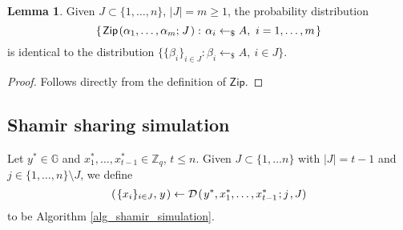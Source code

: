 \documentclass[10pt, psamsfonts, reqno]{amsart}
\theoremstyle{definition}
\newtheorem{lemma}[thm]{Lemma}
\theoremstyle{remark}
\numberwithin{equation}{section}
\begin{document}
\begin{lemma}\label{zip_lemma}
Given $J \subset \{1, \dots, n\}$, $|J| = m \ge 1$,
the probability distribution
\vspace{5pt}
\begin{equation*}
\{\hspace{1pt}
\mathsf{Zip}\hspace{1pt}(
\alpha_1, \dots, \alpha_m;\hspace{1pt} J\hspace{1pt}):
\hspace{1pt}\alpha_i \leftarrow_\$ A,
\ i = 1, \dots, m
\hspace{1pt}\}
\vspace{5pt}
\end{equation*}
is identical to the distribution
$\{\{\beta_i\}_{i \in J}: \beta_i \leftarrow_\$ A,\ i \in J\}$.
\end{lemma}

\begin{proof}
Follows directly from the definition of $\mathsf{Zip}$.
\end{proof}

\subsection{Shamir sharing simulation}\label{section_shamir_sharing_simulation}

Let $y^* \in \mathbb{G}$ and
$x_1^*, \dots, x_{t-1}^* \in \mathbb{Z}_q$, $t \le n$.
Given $J \subset \{1, \dots n\}$ with $|J| = t-1$
and $j \in \{1, \dots, n\} \setminus J$,
we define
\vspace{5pt}
\begin{equation}\label{shamir_embedding_ref}
(\hspace{1pt}\{x_i\}_{i \in J},\hspace{1pt} y\hspace{1pt})
\leftarrow
\mathcal{D}\hspace{1pt}(
	\hspace{1pt}y^*,
	x_1^*, \dots, x_{t-1}^*
	\hspace{1pt};
	j\hspace{1pt},
	J
)
\vspace{0pt}
\end{equation}
to be Algorithm \ref{alg_shamir_simulation}.
\end{document}
